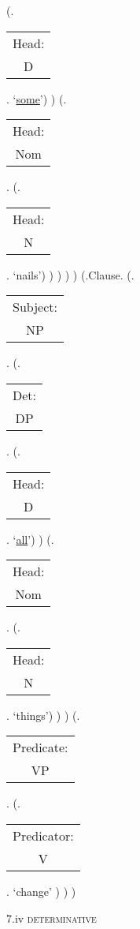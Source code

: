 \documentclass[12pt,letterpaper]{article}
\begin{document}
\begin{figure}
\begin{center}
\begin{parsetree}
			(.\begin{tabular}{c}Head:\\D\end{tabular}. `\underline{some}')
			)
			(.\begin{tabular}{c}Head:\\Nom\end{tabular}.
			(.\begin{tabular}{c}Head:\\N\end{tabular}. `nails')
			)
			)
			)
			)
			(.Clause.
			(.\begin{tabular}{c}Subject:\\NP\end{tabular}.
			(.\begin{tabular}{c}Det:\\DP\end{tabular}.
			(.\begin{tabular}{c}Head:\\D\end{tabular}. `\underline{all}')
			)
			(.\begin{tabular}{c}Head:\\Nom\end{tabular}.
			(.\begin{tabular}{c}Head:\\N\end{tabular}. `things')
			)
			)
			(.\begin{tabular}{c}Predicate:\\VP\end{tabular}.
			(.\begin{tabular}{c}Predicator:\\V\end{tabular}. `change' )
			)
			)
			
			\hfill \break\hfill \break
		\end{parsetree}
	7.iv \textsc{determinative}
\end{center}
\end{figure}

			
\end{document}
